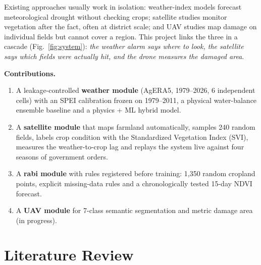 \documentclass[11pt,a4paper,oneside]{article}
\begin{document}
Existing approaches usually work in isolation: weather-index models forecast meteorological drought without checking crops; satellite studies monitor vegetation after the fact, often at district scale; and UAV studies map damage on individual fields but cannot cover a region. This project links the three in a cascade (Fig.~\ref{fig:system}): \emph{the weather alarm says where to look, the satellite says which fields were actually hit, and the drone measures the damaged area}.

\textbf{Contributions.}
\begin{enumerate}
\item A leakage-controlled \textbf{weather module} (AgERA5, 1979--2026, 6 independent cells) with an SPEI calibration frozen on 1979--2011, a physical water-balance ensemble baseline and a physics + ML hybrid model.
\item A \textbf{satellite module} that maps farmland automatically, samples 240 random fields, labels crop condition with the Standardized Vegetation Index (SVI), measures the weather-to-crop lag and replays the system live against four seasons of government orders.
\item A \textbf{rabi module} with rules registered before training: 1,350 random cropland points, explicit missing-data rules and a chronologically tested 15-day NDVI forecast.
\item A \textbf{UAV module} for 7-class semantic segmentation and metric damage area (in progress).
\end{enumerate}

\section{Literature Review}
\end{document}
